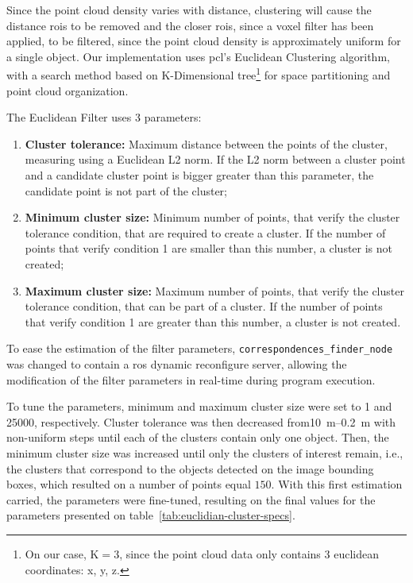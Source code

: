 Since the point cloud density varies with distance, clustering will cause the distance \acp{roi} to be removed and the closer \acp{roi}, since a voxel filter has been applied, to be filtered, since the point cloud density is approximately uniform for a single object. Our implementation uses \ac{pcl}'s Euclidean Clustering algorithm, with a search method based on K-Dimensional tree\footnote{On our case, K$=3$, since the point cloud data only contains 3 euclidean coordinates: x, y, z.} for space partitioning and point cloud organization.

The Euclidean Filter uses 3 parameters:

\begin{enumerate}
	\item \textbf{Cluster tolerance:} Maximum distance between the points of the cluster, measuring using a Euclidean L2 norm. If the L2 norm between a cluster point and a candidate cluster point is bigger greater than this parameter, the candidate point is not part of the cluster;
	\item \textbf{Minimum cluster size:} Minimum number of points, that verify the cluster tolerance condition, that are required to create a cluster. If the number of points that verify condition 1 are smaller than this number, a cluster is not created;
	\item \textbf{Maximum cluster size:} Maximum number of points, that verify the cluster tolerance condition, that can be part of a cluster. If the number of points that verify condition 1 are greater than this number, a cluster is not created.
\end{enumerate}

To ease the estimation of the filter parameters, \texttt{correspondences\_finder\_node} was changed to contain a \ac{ros} dynamic reconfigure server, allowing the modification of the filter parameters in real-time during program execution. 

To tune the parameters, minimum and maximum cluster size were set to 1 and 25000, respectively. Cluster tolerance was then decreased from\SIrange{10}{0.2}{\meter} with non-uniform steps until each of the clusters contain only one object. Then, the minimum cluster size was increased until only the clusters of interest remain, i.e., the clusters that correspond to the objects detected on the image bounding boxes, which resulted on a number of points equal $150$. With this first estimation carried, the parameters were fine-tuned, resulting on the final values for the parameters presented on table~\ref{tab:euclidian-cluster-specs}.

